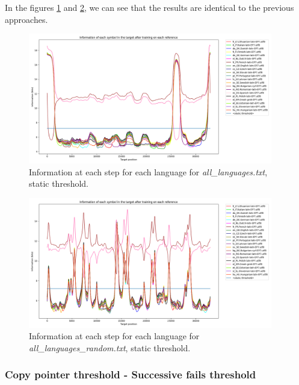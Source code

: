 \documentclass{article}
\begin{document}
In the figures \ref{fig:all_languages_t_n} and \ref{fig:all_languages_random_t_n}, we can see that the results are identical to the previous approaches.

\begin{figure}
    \centering
    \includegraphics[width=0.95\textwidth]{../results/all_languages/-t_n:0.5.png}
    \caption{Information at each step for each language for \textit{all\_languages.txt}, static threshold.}
    \label{fig:all_languages_t_n}
\end{figure}

\begin{figure}
    \centering
    \includegraphics[width=0.95\textwidth]{../results/all_languages_random/-t_n:0.5.png}
    \caption{Information at each step for each language for \textit{all\_languages\_random.txt}, static threshold.}
    \label{fig:all_languages_random_t_n}
\end{figure}

\subsubsection{Copy pointer threshold - Successive fails threshold}
\label{subsubsec:results_locate_lang_successive_fails_threshold}
\end{document}
